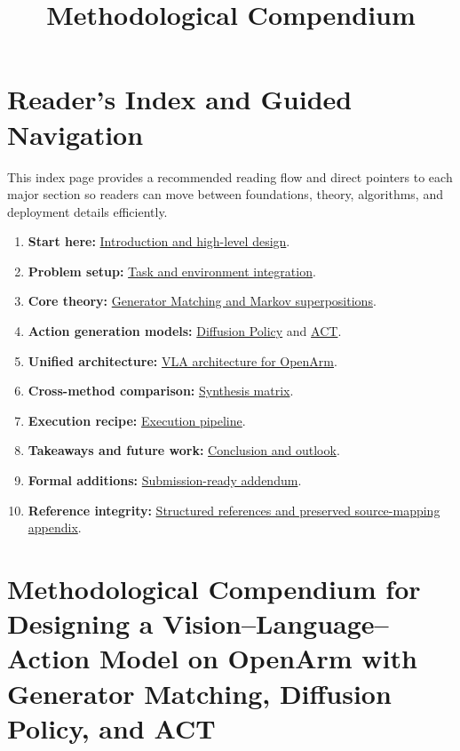 \documentclass[
]{article}
\title{Methodological Compendium}
\author{}
\date{}
\theoremstyle{remark}
\begin{document}
\onecolumn
\maketitle

\setcounter{tocdepth}{2}
\tableofcontents

\section*{Reader's Index and Guided Navigation}
This index page provides a recommended reading flow and direct pointers to each major section so readers can move between foundations, theory, algorithms, and deployment details efficiently.

\begin{enumerate}
\item \textbf{Start here:} \hyperref[introduction-and-high-level-design]{Introduction and high-level design}.
\item \textbf{Problem setup:} \hyperref[task-and-environment-integration-the-foundation]{Task and environment integration}.
\item \textbf{Core theory:} \hyperref[generator-matching-theory-and-markov-superpositions]{Generator Matching and Markov superpositions}.
\item \textbf{Action generation models:} \hyperref[diffusion-policy-diffusion-as-an-action-policy]{Diffusion Policy} and \hyperref[act-action-chunking-with-transformers]{ACT}.
\item \textbf{Unified architecture:} \hyperref[vla-architecture-for-openarm-inspired-by-openvla]{VLA architecture for OpenArm}.
\item \textbf{Cross-method comparison:} \hyperref[synthesis-matrix-the-visual-anchor]{Synthesis matrix}.
\item \textbf{Execution recipe:} \hyperref[execution-pipeline-the-action-plan]{Execution pipeline}.
\item \textbf{Takeaways and future work:} \hyperref[conclusion-and-outlook]{Conclusion and outlook}.
\item \textbf{Formal additions:} \hyperref[submission-ready-addendum-algorithms-theorems-and-innovations]{Submission-ready addendum}.
\item \textbf{Reference integrity:} \hyperref[references-and-source-mapping]{Structured references and preserved source-mapping appendix}.
\end{enumerate}

\section{Methodological Compendium for Designing a
Vision--Language--Action Model on OpenArm with Generator Matching,
Diffusion Policy, and
ACT}\label{methodological-compendium-for-designing-a-visionlanguageaction-model-on-openarm-with-generator-matching-diffusion-policy-and-act}
\end{document}
